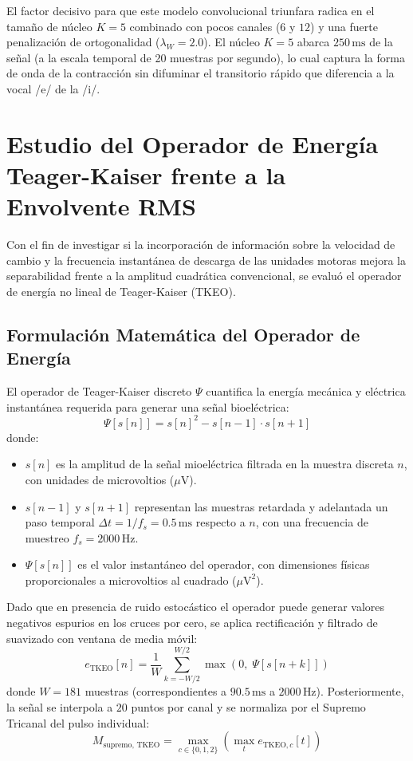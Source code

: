 \documentclass[11pt,a4paper,openany]{book}
\theoremstyle{definition}
\begin{document}
El factor decisivo para que este modelo convolucional triunfara radica en el tamaño de núcleo $K=5$ combinado con pocos canales ($6$ y $12$) y una fuerte penalización de ortogonalidad ($\lambda_W = 2.0$). El núcleo $K=5$ abarca $250\,\text{ms}$ de la señal (a la escala temporal de 20 muestras por segundo), lo cual captura la forma de onda de la contracción sin difuminar el transitorio rápido que diferencia a la vocal /e/ de la /i/.

\section{Estudio del Operador de Energía Teager-Kaiser frente a la Envolvente RMS}
\label{sec:estudio_tkeo}

Con el fin de investigar si la incorporación de información sobre la velocidad de cambio y la frecuencia instantánea de descarga de las unidades motoras mejora la separabilidad frente a la amplitud cuadrática convencional, se evaluó el operador de energía no lineal de Teager-Kaiser (TKEO).

\subsection{Formulación Matemática del Operador de Energía}
\label{subsec:form_tkeo}

El operador de Teager-Kaiser discreto $\Psi$ cuantifica la energía mecánica y eléctrica instantánea requerida para generar una señal bioeléctrica:
\begin{equation}
    \Psi[s[n]] = s[n]^2 - s[n-1] \cdot s[n+1]
\end{equation}
donde:
\begin{itemize}
    \item $s[n]$ es la amplitud de la señal mioeléctrica filtrada en la muestra discreta $n$, con unidades de microvoltios ($\mu\text{V}$).
    \item $s[n-1]$ y $s[n+1]$ representan las muestras retardada y adelantada un paso temporal $\Delta t = 1/f_s = 0.5\,\text{ms}$ respecto a $n$, con una frecuencia de muestreo $f_s = 2000\,\text{Hz}$.
    \item $\Psi[s[n]]$ es el valor instantáneo del operador, con dimensiones físicas proporcionales a microvoltios al cuadrado ($\mu\text{V}^2$).
\end{itemize}

Dado que en presencia de ruido estocástico el operador puede generar valores negativos espurios en los cruces por cero, se aplica rectificación y filtrado de suavizado con ventana de media móvil:
\begin{equation}
    e_{\text{TKEO}}[n] = \frac{1}{W} \sum_{k=-W/2}^{W/2} \max(0, \; \Psi[s[n+k]])
\end{equation}
donde $W = 181$ muestras (correspondientes a $90.5\,\text{ms}$ a $2000\,\text{Hz}$). Posteriormente, la señal se interpola a $20$ puntos por canal y se normaliza por el Supremo Tricanal del pulso individual:
\begin{equation}
    M_{\text{supremo, TKEO}} = \max_{c \in \{0, 1, 2\}} \left( \max_{t} e_{\text{TKEO}, c}[t] \right)
\end{equation}
\end{document}
